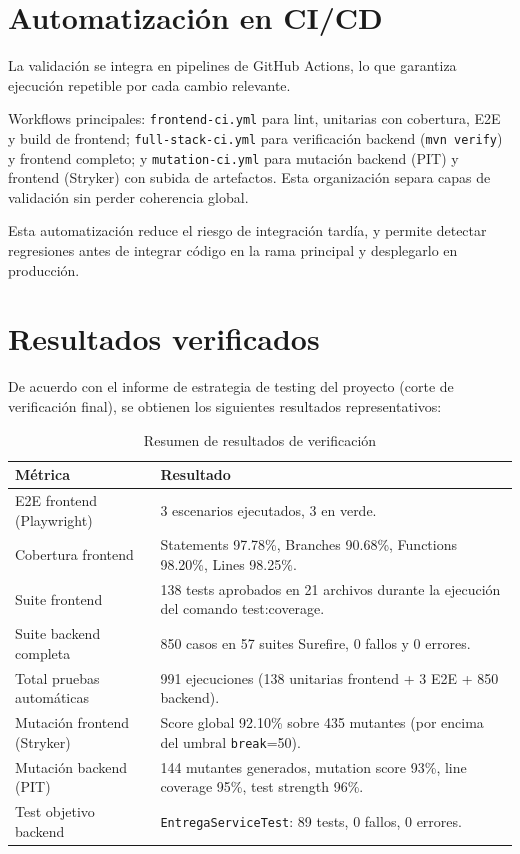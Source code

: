 \FloatBarrier
\section{Automatizaci\'on en CI/CD}

La validaci\'on se integra en pipelines de GitHub Actions,
lo que garantiza ejecuci\'on repetible por cada cambio relevante.

Workflows principales: \texttt{frontend-ci.yml} para lint, unitarias con cobertura, E2E y build de frontend; \texttt{full-stack-ci.yml} para verificaci\'on backend (\texttt{mvn verify}) y frontend completo; y \texttt{mutation-ci.yml} para mutaci\'on backend (PIT) y frontend (Stryker) con subida de artefactos. Esta organizaci\'on separa capas de validaci\'on sin perder coherencia global.

Esta automatizaci\'on reduce el riesgo de integraci\'on tard\'ia, y permite detectar regresiones antes de integrar c\'odigo en la rama principal y desplegarlo en producci\'on.

\FloatBarrier
\section{Resultados verificados}

De acuerdo con el informe de estrategia de testing del proyecto
(corte de verificaci\'on final), se obtienen los siguientes resultados representativos:

\begin{table}[!htbp]
\centering
\begin{tabular}{|P{4.4cm}|P{7.4cm}|}
\hline
\textbf{M\'etrica} & \textbf{Resultado} \\
\hline
E2E frontend (Playwright) & 3 escenarios ejecutados, 3 en verde. \\
\hline
Cobertura frontend & Statements 97.78\%, Branches 90.68\%, Functions 98.20\%, Lines 98.25\%. \\
\hline
Suite frontend & 138 tests aprobados en 21 archivos durante la ejecuci\'on del comando test:coverage. \\
\hline
Suite backend completa & 850 casos en 57 suites Surefire, 0 fallos y 0 errores. \\
\hline
Total pruebas autom\'aticas & 991 ejecuciones (138 unitarias frontend + 3 E2E + 850 backend). \\
\hline
Mutaci\'on frontend (Stryker) & Score global 92.10\% sobre 435 mutantes (por encima del umbral \texttt{break}=50). \\
\hline
Mutaci\'on backend (PIT) & 144 mutantes generados, mutation score 93\%, line coverage 95\%, test strength 96\%. \\
\hline
Test objetivo backend & \texttt{EntregaServiceTest}: 89 tests, 0 fallos, 0 errores. \\
\hline
\end{tabular}
\caption{Resumen de resultados de verificaci\'on}
\label{tab:resultados-pruebas}
\end{table}

